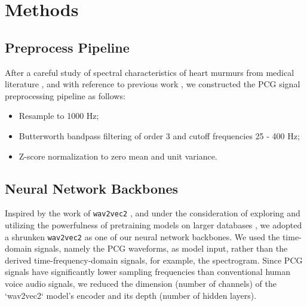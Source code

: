 \section{Methods}
\label{sec:methods}




\subsection{Preprocess Pipeline}
\label{subsec:preproc}

After a careful study of spectral characteristics of heart murmurs from medical literature \cite{Donnerstein_1989, Noponen_2007}, and with reference to previous work \cite{Schmidt_2010}, we constructed the PCG signal preprocessing pipeline as follows:
\begin{itemize}
    \item Resample to 1000 Hz;
    \item Butterworth bandpass filtering of order 3 and cutoff frequencies 25 - 400 Hz;
    \item Z-score normalization to zero mean and unit variance.
\end{itemize}

\subsection{Neural Network Backbones}
\label{subsec:backbone}

Inspired by the work of \texttt{wav2vec2} \cite{baevski2020wav2vec}, and under the consideration of exploring and utilizing the powerfulness of pretraining models on larger databases \cite{wolf-etal-2020-transformers}, we adopted a shrunken \texttt{wav2vec2} as one of our neural network backbones. We used the time-domain signals, namely the PCG waveforms, as model input, rather than the derived time-frequency-domain signals, for example, the spectrogram. Since PCG signals have significantly lower sampling frequencies than conventional human voice audio signals, we reduced the dimension (number of channels) of the `wav2vec2` model's encoder and its depth (number of hidden layers).


